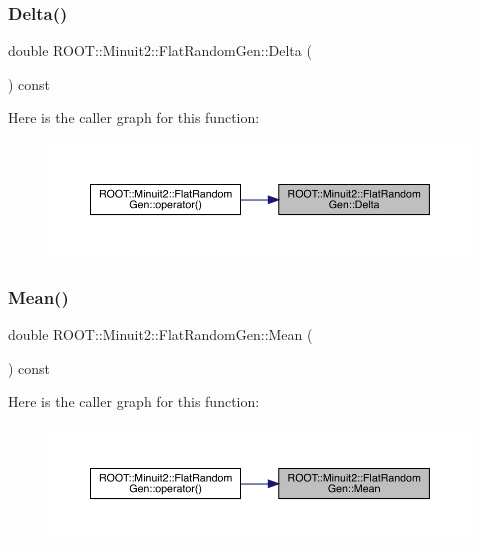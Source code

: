 \subsubsection{\texorpdfstring{Delta()}{Delta()}}
{\footnotesize\ttfamily double R\+O\+O\+T\+::\+Minuit2\+::\+Flat\+Random\+Gen\+::\+Delta (\begin{DoxyParamCaption}{ }\end{DoxyParamCaption}) const\hspace{0.3cm}{\ttfamily [inline]}}

Here is the caller graph for this function\+:\nopagebreak
\begin{figure}[H]
\begin{center}
\leavevmode
\includegraphics[width=350pt]{dc/d91/classROOT_1_1Minuit2_1_1FlatRandomGen_ad277acd252616d99e83d3438065cc154_icgraph}
\end{center}
\end{figure}
\mbox{\label{classROOT_1_1Minuit2_1_1FlatRandomGen_ab934b4a66f13eaaf30c9a9280c7ddb10}} 
\subsubsection{\texorpdfstring{Mean()}{Mean()}}
{\footnotesize\ttfamily double R\+O\+O\+T\+::\+Minuit2\+::\+Flat\+Random\+Gen\+::\+Mean (\begin{DoxyParamCaption}{ }\end{DoxyParamCaption}) const\hspace{0.3cm}{\ttfamily [inline]}}

Here is the caller graph for this function\+:\nopagebreak
\begin{figure}[H]
\begin{center}
\leavevmode
\includegraphics[width=350pt]{dc/d91/classROOT_1_1Minuit2_1_1FlatRandomGen_ab934b4a66f13eaaf30c9a9280c7ddb10_icgraph}
\end{center}
\end{figure}
\mbox{\label{classROOT_1_1Minuit2_1_1FlatRandomGen_ac04ef969864af18fdfdc104f2491e031}} 
